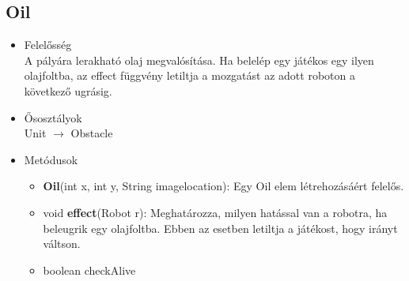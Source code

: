 \subsection{Oil}
\begin{itemize}
\item Felelősség\\
A pályára lerakható olaj megvalósítása. Ha belelép egy játékos egy ilyen olajfoltba, az effect függvény letiltja a mozgatást az adott roboton a következő ugrásig.
\item Ősosztályok\\
Unit $\rightarrow$ Obstacle 
\item Metódusok
	\begin{itemize}
		\item \textbf{Oil}(int x, int y, String imagelocation): Egy Oil elem létrehozásáért felelős.
		\item void \textbf{effect}(Robot r): Meghatározza, milyen hatással van a robotra, ha beleugrik egy olajfoltba. Ebben az esetben letiltja a játékost, hogy irányt váltson.
		\item boolean checkAlive 
	\end{itemize}
\end{itemize}

